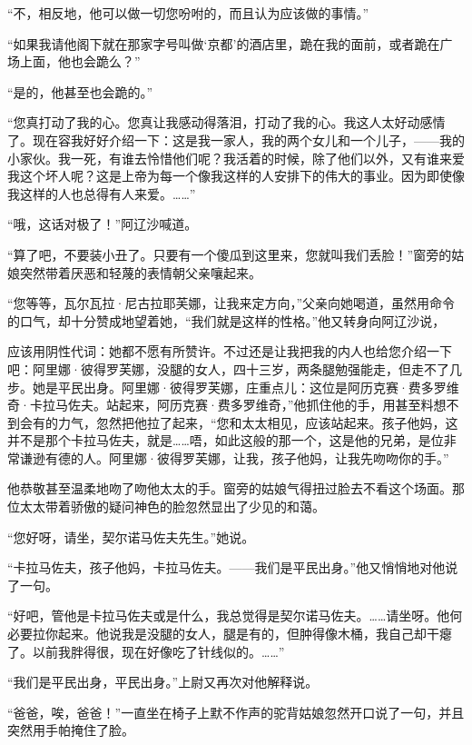 \par “不，相反地，他可以做一切您吩咐的，而且认为应该做的事情。”
\par “如果我请他阁下就在那家字号叫做‘京都’的酒店里，跪在我的面前，或者跪在广场上面，他也会跪么？”
\par “是的，他甚至也会跪的。”
\par “您真打动了我的心。您真让我感动得落泪，打动了我的心。我这人太好动感情了。现在容我好好介绍一下：这是我一家人，我的两个女儿和一个儿子，——我的小家伙。我一死，有谁去怜惜他们呢？我活着的时候，除了他们以外，又有谁来爱我这个坏人呢？这是上帝为每一个像我这样的人安排下的伟大的事业。因为即使像我这样的人也总得有人来爱。……”
\par “哦，这话对极了！”阿辽沙喊道。
\par “算了吧，不要装小丑了。只要有一个傻瓜到这里来，您就叫我们丢脸！”窗旁的姑娘突然带着厌恶和轻蔑的表情朝父亲嚷起来。
\par “您等等，瓦尔瓦拉·尼古拉耶芙娜，让我来定方向，”父亲向她喝道，虽然用命令的口气，却十分赞成地望着她，“我们就是这样的性格。”他又转身向阿辽沙说，
\par 应该用阴性代词：她都不愿有所赞许。不过还是让我把我的内人也给您介绍一下吧：阿里娜·彼得罗芙娜，没腿的女人，四十三岁，两条腿勉强能走，但走不了几步。她是平民出身。阿里娜·彼得罗芙娜，庄重点儿：这位是阿历克赛·费多罗维奇·卡拉马佐夫。站起来，阿历克赛·费多罗维奇，”他抓住他的手，用甚至料想不到会有的力气，忽然把他拉了起来，“您和太太相见，应该站起来。孩子他妈，这并不是那个卡拉马佐夫，就是……唔，如此这般的那一个，这是他的兄弟，是位非常谦逊有德的人。阿里娜·彼得罗芙娜，让我，孩子他妈，让我先吻吻你的手。”
\par 他恭敬甚至温柔地吻了吻他太太的手。窗旁的姑娘气得扭过脸去不看这个场面。那位太太带着骄傲的疑问神色的脸忽然显出了少见的和蔼。
\par “您好呀，请坐，契尔诺马佐夫先生。”她说。
\par “卡拉马佐夫，孩子他妈，卡拉马佐夫。——我们是平民出身。”他又悄悄地对他说了一句。
\par “好吧，管他是卡拉马佐夫或是什么，我总觉得是契尔诺马佐夫。……请坐呀。他何必要拉你起来。他说我是没腿的女人，腿是有的，但肿得像木桶，我自己却干瘪了。以前我胖得很，现在好像吃了针线似的。……”
\par “我们是平民出身，平民出身。”上尉又再次对他解释说。
\par “爸爸，唉，爸爸！”一直坐在椅子上默不作声的驼背姑娘忽然开口说了一句，并且突然用手帕掩住了脸。
